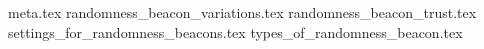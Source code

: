 {meta.tex}
{randomness_beacon_variations.tex}
{randomness_beacon_trust.tex}
{settings_for_randomness_beacons.tex}
{types_of_randomness_beacon.tex}
